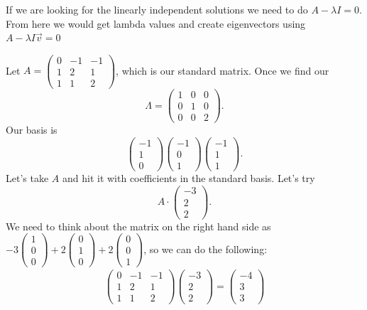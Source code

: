 If we are looking for the linearly independent solutions we need to do $A-\lambda I=0$. From here we would get lambda values and create eigenvectors using $A-\lambda I\vec{v}=0$
\begin{eg}
  Let $A=\begin{pmatrix} 0&-1&-1\\1&2&1\\1&1&2 \end{pmatrix} $, which is our standard matrix. Once we find our \[
  \Lambda = \begin{pmatrix} 1&0&0\\0&1&0\\0&0&2 \end{pmatrix} 
  .\] Our basis is \[
  \begin{pmatrix} -1\\1\\0 \end{pmatrix} \begin{pmatrix} -1\\0\\1 \end{pmatrix} \begin{pmatrix} -1\\1\\1 \end{pmatrix} 
  .\] Let's take $A$ and hit it with coefficients in the standard basis. Let's try \[
  A\cdot\begin{pmatrix} -3\\2\\2 \end{pmatrix} 
  .\] We need to think about the matrix on the right hand side as $-3\begin{pmatrix} 1\\0\\0 \end{pmatrix} +2\begin{pmatrix} 0\\1\\0 \end{pmatrix} +2\begin{pmatrix} 0\\0\\1 \end{pmatrix} $, so we can do the following:
  \begin{align*}
    \begin{pmatrix} 0&-1&-1\\1&2&1\\1&1&2 \end{pmatrix} \begin{pmatrix} -3\\2\\2 \end{pmatrix} =\begin{pmatrix} -4\\3\\3 \end{pmatrix} 

\end{align*}
\end{eg}
